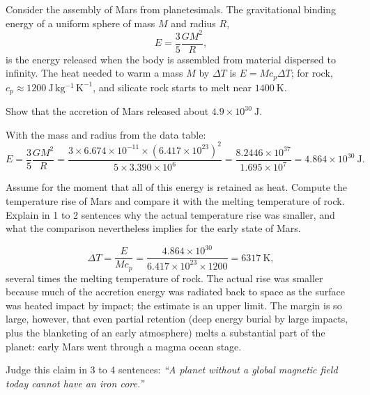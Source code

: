 
Consider the assembly of Mars from planetesimals.
The gravitational binding energy of a uniform sphere of mass $M$ and radius $R$,
\[
  E = \frac{3}{5} \frac{G M^2}{R},
\]
is the energy released when the body is assembled from material dispersed to infinity.
The heat needed to warm a mass $M$ by $\Delta T$ is $E = M c_p \Delta T$; for rock, $c_p \approx 1200\ \mathrm{J\,kg^{-1}\,K^{-1}}$, and silicate rock starts to melt near $1400\ \mathrm{K}$.

\parti {} Show that the accretion of Mars released about $4.9 \times 10^{30}\ \mathrm{J}$.

\begin{solution}
With the mass and radius from the data table:
\[
  E = \frac{3}{5} \frac{G M^2}{R}
    = \frac{3 \times 6.674 \times 10^{-11} \times (6.417 \times 10^{23})^2}{5 \times 3.390 \times 10^{6}}
    = \frac{8.2446 \times 10^{37}}{1.695 \times 10^{7}}
    = 4.864 \times 10^{30}\ \mathrm{J}.
\]
\end{solution}

\parti {} Assume for the moment that all of this energy is retained as heat.
Compute the temperature rise of Mars and compare it with the melting temperature of rock.
Explain in 1 to 2 sentences why the actual temperature rise was smaller, and what the comparison nevertheless implies for the early state of Mars.

\begin{solution}
\[
  \Delta T = \frac{E}{M c_p} = \frac{4.864 \times 10^{30}}{6.417 \times 10^{23} \times 1200} = 6317\ \mathrm{K},
\]
several times the melting temperature of rock.
The actual rise was smaller because much of the accretion energy was radiated back to space as the surface was heated impact by impact; the estimate is an upper limit.
The margin is so large, however, that even partial retention (deep energy burial by large impacts, plus the blanketing of an early atmosphere) melts a substantial part of the planet: early Mars went through a magma ocean stage.
\end{solution}

\parti {} Judge this claim in 3 to 4 sentences:
\emph{``A planet without a global magnetic field today cannot have an iron core.''}

